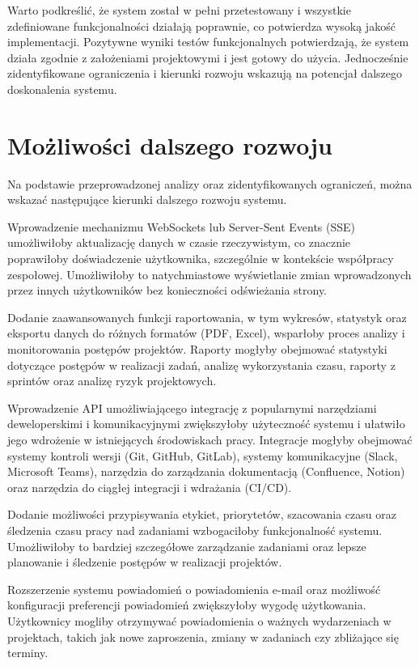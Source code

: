 Warto podkreślić, że system został w pełni przetestowany i wszystkie zdefiniowane funkcjonalności działają poprawnie, co potwierdza wysoką jakość implementacji. Pozytywne wyniki testów funkcjonalnych potwierdzają, że system działa zgodnie z założeniami projektowymi i jest gotowy do użycia. Jednocześnie zidentyfikowane ograniczenia i kierunki rozwoju wskazują na potencjał dalszego doskonalenia systemu.

\section{Możliwości dalszego rozwoju}

Na podstawie przeprowadzonej analizy oraz zidentyfikowanych ograniczeń, można wskazać następujące kierunki dalszego rozwoju systemu.

Wprowadzenie mechanizmu WebSockets lub Server-Sent Events (SSE) umożliwiłoby aktualizację danych w czasie rzeczywistym, co znacznie poprawiłoby doświadczenie użytkownika, szczególnie w kontekście współpracy zespołowej. Umożliwiłoby to natychmiastowe wyświetlanie zmian wprowadzonych przez innych użytkowników bez konieczności odświeżania strony.

Dodanie zaawansowanych funkcji raportowania, w tym wykresów, statystyk oraz eksportu danych do różnych formatów (PDF, Excel), wsparłoby proces analizy i monitorowania postępów projektów. Raporty mogłyby obejmować statystyki dotyczące postępów w realizacji zadań, analizę wykorzystania czasu, raporty z sprintów oraz analizę ryzyk projektowych.

Wprowadzenie API umożliwiającego integrację z popularnymi narzędziami deweloperskimi i komunikacyjnymi zwiększyłoby użyteczność systemu i ułatwiło jego wdrożenie w istniejących środowiskach pracy. Integracje mogłyby obejmować systemy kontroli wersji (Git, GitHub, GitLab), systemy komunikacyjne (Slack, Microsoft Teams), narzędzia do zarządzania dokumentacją (Confluence, Notion) oraz narzędzia do ciągłej integracji i wdrażania (CI/CD).

Dodanie możliwości przypisywania etykiet, priorytetów, szacowania czasu oraz śledzenia czasu pracy nad zadaniami wzbogaciłoby funkcjonalność systemu. Umożliwiłoby to bardziej szczegółowe zarządzanie zadaniami oraz lepsze planowanie i śledzenie postępów w realizacji projektów.

Rozszerzenie systemu powiadomień o powiadomienia e-mail oraz możliwość konfiguracji preferencji powiadomień zwiększyłoby wygodę użytkowania. Użytkownicy mogliby otrzymywać powiadomienia o ważnych wydarzeniach w projektach, takich jak nowe zaproszenia, zmiany w zadaniach czy zbliżające się terminy.


